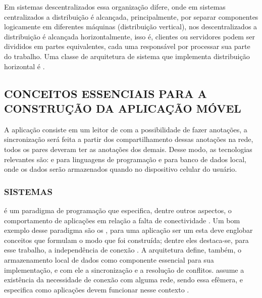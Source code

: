Em sistemas descentralizados essa organização difere, onde em sistemas centralizados a distribuição é alcançada, principalmente, por separar componentes logicamente em diferentes máquinas (distribuição vertical), nos descentralizados a distribuição é alcançada horizontalmente, isso é, clientes ou servidores podem ser divididos em partes equivalentes, cada uma responsável por processar sua parte do trabalho. Uma classe de arquitetura de sistema que implementa distribuição horizontal é  \cite{tanenbaum2007dist}.

\subsection{CONCEITOS ESSENCIAIS PARA A CONSTRUÇÃO DA APLICAÇÃO MÓVEL}

A aplicação consiste em um leitor de  com a possibilidade de fazer anotações, a sincronização será feita a partir dos compartilhamento dessas anotações na rede, todos os pares deveram ter as anotações dos demais. Desse modo, as tecnologias relevantes são:  e  para linguagens de programação e  para banco de dados local, onde os dados serão armazenados quando no dispositivo celular do usuário.

\subsubsection{SISTEMAS }

 é um paradigma de programação que especifica, dentre outros aspectos, o comportamento de aplicações em relação a falta de conectividade \cite{OfflineFirst}. Um bom exemplo desse paradigma são os , para uma aplicação ser um  esta deve englobar conceitos que formulam o modo que foi construída; dentre eles destaca-se, para esse trabalho, a independência de conexão \cite{BjornHansen2018PWAUnifiedMobile}. A arquitetura define, também, o armazenamento local de dados como componente essencial para sua implementação, e com ele a sincronização e a resolução de conflitos.  assume a existência da necessidade de conexão com alguma rede, sendo essa efêmera, e especifica como aplicações devem funcionar nesse contexto \cite{Guda2025OfflineFirstAndroidChat}.  

